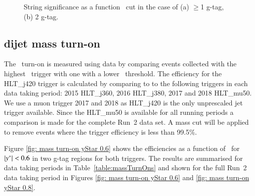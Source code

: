 \begin{figure}[htbp]
        \centering
        \caption{String significance as a function \ystar\ cut in the case of (a) $\geq$1 g-tag, (b) 2 g-tag.}
        \label{fig: string significance as a function of y* cut}
\end{figure}

\subsection{dijet mass turn-on}


The \mjj\ turn-on is measured using data by comparing events collected with the highest \pT\ 
trigger with one with a lower \pt\ threshold.  The efficiency for the HLT\_j420 trigger is calculated by comparing to to the 
following triggers in each data taking period: 2015 HLT\_j360, 2016 HLT\_j380, 2017 and 2018 HLT\_mu50. We use a muon trigger 
2017 and 2018 as HLT\_j420 is the only unprescaled jet trigger available. Since the HLT\_mu50 is available for all running periods 
a comparison is made for the complete Run~2 data set. 
A mass cut will be applied to remove events where 
the trigger efficiency is less than 99.5\%.



Figure \ref{fig: mass turn-on yStar 0.6} shows the efficiencies as a function of \mjj\ for $|y^\ast|<0.6$ in 
two g-tag regions for both triggers.  The results 
are summarised for data taking periods in Table~\ref{table:massTurnOns} and shown for the full Run~2 data 
taking period in Figures \ref{fig: mass turn-on yStar 0.6} and \ref{fig: mass turn-on yStar 0.8}. 


